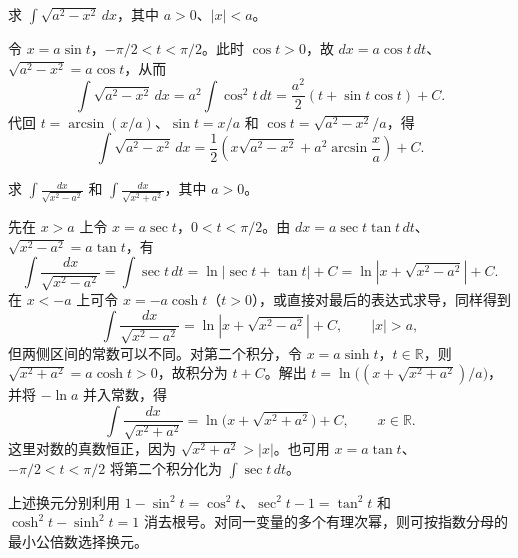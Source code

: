 \begin{example}
\label{ex:trigonometric-substitution-for-semicircle}
求 $\displaystyle\int\sqrt{a^2-x^2}\,dx$，其中 $a>0$、$|x|<a$。
\end{example}

\begin{solve}
令 $x=a\sin t$，$-\pi/2<t<\pi/2$。此时 $\cos t>0$，故 $dx=a\cos t\,dt$、$\sqrt{a^2-x^2}=a\cos t$，从而
\[
    \int\sqrt{a^2-x^2}\,dx
      =a^2\int\cos^2t\,dt
      =\frac{a^2}{2}(t+\sin t\cos t)+C.
\]
代回 $t=\arcsin(x/a)$、$\sin t=x/a$ 和 $\cos t=\sqrt{a^2-x^2}/a$，得
\begin{equation}
    \int\sqrt{a^2-x^2}\,dx
      =\frac12\left(x\sqrt{a^2-x^2}+a^2\arcsin\frac xa\right)+C.
    \label{eq:semicircle-antiderivative}
\end{equation}
\end{solve}

\begin{example}
\label{ex:logarithmic-integrals-of-quadratic-radicals}
求 $\displaystyle\int\frac{dx}{\sqrt{x^2-a^2}}$ 和 $\displaystyle\int\frac{dx}{\sqrt{x^2+a^2}}$，其中 $a>0$。
\end{example}

\begin{solve}
先在 $x>a$ 上令 $x=a\sec t$，$0<t<\pi/2$。由 $dx=a\sec t\tan t\,dt$、$\sqrt{x^2-a^2}=a\tan t$，有
\[
    \int\frac{dx}{\sqrt{x^2-a^2}}
       =\int\sec t\,dt
       =\ln|\sec t+\tan t|+C
       =\ln|x+\sqrt{x^2-a^2}|+C.
\]
在 $x<-a$ 上可令 $x=-a\cosh t$（$t>0$），或直接对最后的表达式求导，同样得到
\begin{equation}
    \int\frac{dx}{\sqrt{x^2-a^2}}
       =\ln|x+\sqrt{x^2-a^2}|+C,\qquad |x|>a,
    \label{eq:reciprocal-difference-radical-integral}
\end{equation}
但两侧区间的常数可以不同。对第二个积分，令 $x=a\sinh t$，$t\in\mathbb{R}$，则 $\sqrt{x^2+a^2}=a\cosh t>0$，故积分为 $t+C$。解出 $t=\ln\bigl((x+\sqrt{x^2+a^2})/a\bigr)$，并将 $-\ln a$ 并入常数，得
\begin{equation}
    \int\frac{dx}{\sqrt{x^2+a^2}}
       =\ln\bigl(x+\sqrt{x^2+a^2}\bigr)+C,
       \qquad x\in\mathbb{R}.
    \label{eq:reciprocal-sum-radical-integral}
\end{equation}
这里对数的真数恒正，因为 $\sqrt{x^2+a^2}>|x|$。也可用 $x=a\tan t$、$-\pi/2<t<\pi/2$ 将第二个积分化为 $\int\sec t\,dt$。
\end{solve}

上述换元分别利用 $1-\sin^2t=\cos^2t$、$\sec^2t-1=\tan^2t$ 和 $\cosh^2t-\sinh^2t=1$ 消去根号。对同一变量的多个有理次幂，则可按指数分母的最小公倍数选择换元。

